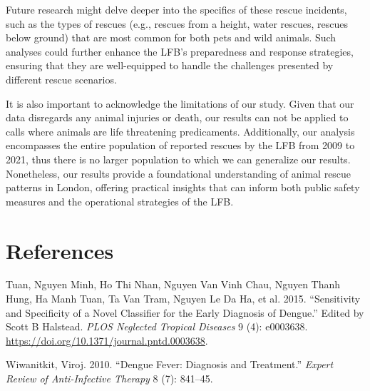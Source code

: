 \documentclass[
]{article}
\newlength{\cslhangindent}
\newlength{\cslentryspacingunit} %
\newenvironment{CSLReferences}[2] %
 {%
  \setlength{\parindent}{0pt}
  \ifodd #1
  \let\oldpar\par
  \def\par{\hangindent=\cslhangindent\oldpar}
  \fi
  \setlength{\parskip}{#2\cslentryspacingunit}
 }%
 {}
\begin{document}
Future research might delve deeper into the specifics of these rescue
incidents, such as the types of rescues (e.g., rescues from a height,
water rescues, rescues below ground) that are most common for both pets
and wild animals. Such analyses could further enhance the LFB's
preparedness and response strategies, ensuring that they are
well-equipped to handle the challenges presented by different rescue
scenarios.

It is also important to acknowledge the limitations of our study. Given
that our data disregards any animal injuries or death, our results can
not be applied to calls where animals are life threatening predicaments.
Additionally, our analysis encompasses the entire population of reported
rescues by the LFB from 2009 to 2021, thus there is no larger population
to which we can generalize our results. Nonetheless, our results provide
a foundational understanding of animal rescue patterns in London,
offering practical insights that can inform both public safety measures
and the operational strategies of the LFB.

\hypertarget{references}{%
\section*{References}\label{references}}

\hypertarget{refs}{}
\begin{CSLReferences}{1}{0}
\leavevmode{}%
Tuan, Nguyen Minh, Ho Thi Nhan, Nguyen Van Vinh Chau, Nguyen Thanh Hung,
Ha Manh Tuan, Ta Van Tram, Nguyen Le Da Ha, et al. 2015. {``Sensitivity
and Specificity of a Novel Classifier for the Early Diagnosis of
Dengue.''} Edited by Scott B Halstead. \emph{PLOS Neglected Tropical
Diseases} 9 (4): e0003638.
\url{https://doi.org/10.1371/journal.pntd.0003638}.

\leavevmode{}%
Wiwanitkit, Viroj. 2010. {``Dengue Fever: Diagnosis and Treatment.''}
\emph{Expert Review of Anti-Infective Therapy} 8 (7): 841--45.

\end{CSLReferences}
\end{document}
